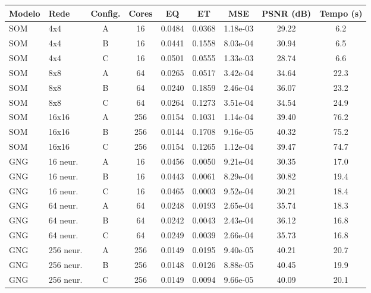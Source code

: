 \begin{tabular}{llccccccc}
\toprule
Modelo & Rede & Config. & Cores & EQ & ET & MSE & PSNR (dB) & Tempo (s)\\
\midrule
SOM & 4x4 & A & 16 & 0.0484 & 0.0368 & 1.18e-03 & 29.22 & 6.2\\
SOM & 4x4 & B & 16 & 0.0441 & 0.1558 & 8.03e-04 & 30.94 & 6.5\\
SOM & 4x4 & C & 16 & 0.0501 & 0.0555 & 1.33e-03 & 28.74 & 6.6\\
\midrule
SOM & 8x8 & A & 64 & 0.0265 & 0.0517 & 3.42e-04 & 34.64 & 22.3\\
SOM & 8x8 & B & 64 & 0.0240 & 0.1859 & 2.46e-04 & 36.07 & 23.2\\
SOM & 8x8 & C & 64 & 0.0264 & 0.1273 & 3.51e-04 & 34.54 & 24.9\\
\midrule
SOM & 16x16 & A & 256 & 0.0154 & 0.1031 & 1.14e-04 & 39.40 & 76.2\\
SOM & 16x16 & B & 256 & 0.0144 & 0.1708 & 9.16e-05 & 40.32 & 75.2\\
SOM & 16x16 & C & 256 & 0.0154 & 0.1265 & 1.12e-04 & 39.47 & 74.7\\
\midrule
GNG & 16 neur. & A & 16 & 0.0456 & 0.0050 & 9.21e-04 & 30.35 & 17.0\\
GNG & 16 neur. & B & 16 & 0.0443 & 0.0061 & 8.29e-04 & 30.82 & 19.4\\
GNG & 16 neur. & C & 16 & 0.0465 & 0.0003 & 9.52e-04 & 30.21 & 18.4\\
\midrule
GNG & 64 neur. & A & 64 & 0.0248 & 0.0193 & 2.65e-04 & 35.74 & 18.3\\
GNG & 64 neur. & B & 64 & 0.0242 & 0.0043 & 2.43e-04 & 36.12 & 16.8\\
GNG & 64 neur. & C & 64 & 0.0249 & 0.0039 & 2.66e-04 & 35.73 & 16.8\\
\midrule
GNG & 256 neur. & A & 256 & 0.0149 & 0.0195 & 9.40e-05 & 40.21 & 20.7\\
GNG & 256 neur. & B & 256 & 0.0148 & 0.0126 & 8.88e-05 & 40.45 & 19.9\\
GNG & 256 neur. & C & 256 & 0.0149 & 0.0094 & 9.66e-05 & 40.09 & 20.1\\
\bottomrule
\end{tabular}
